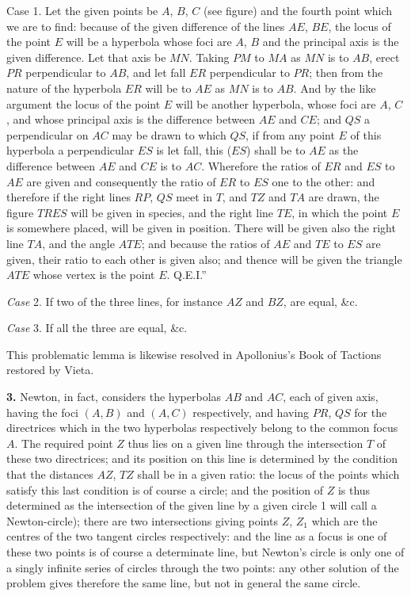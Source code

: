 \documentclass[11pt,a4paper]{book}
\begin{document}
Case 1. Let the given points be $A$, $B$, $C$ (see figure) and the fourth point which we are to find: because of the given difference of the lines $AE$, $BE$, the locus of the point $E$ will be a hyperbola whose foci are $A$, $B$ and the principal axis is the given difference. Let that axis be $MN$. Taking $PM$ to $MA$ as $MN$ is to $AB$, erect $PR$ perpendicular to $AB$, and let fall $ER$ perpendicular to $PR$; then from the nature of the hyperbola $ER$ will be to $AE$ as $MN$ is to $AB$. And by the like argument the locus of the point $E$ will be another hyperbola, whose foci are $A$, $C$, and whose principal axis is the difference between $AE$ and $CE$; and $QS$ a perpendicular on $AC$ may be drawn to which $QS$, if from any point $E$ of this hyperbola a perpendicular $ES$ is let fall, this ($ES$) shall be to $AE$ as the difference between $AE$ and $CE$ is to $AC$. Wherefore the ratios of $ER$ and $ES$ to $AE$ are given and consequently the ratio of $ER$ to $ES$ one to the other: and therefore if the right lines $RP$, $QS$ meet in $T$, and $TZ$ and $TA$ are drawn, the figure $TRES$ will be given in species, and the right line $TE$, in which the point $E$ is somewhere placed, will be given in position. There will be given also the right line $TA$, and the angle $ATE$; and because the ratios of $AE$ and $TE$ to $ES$ are given, their ratio to each other is given also; and thence will be given the triangle $ATE$ whose vertex is the point $E$. \hspace*{\fill} Q.E.I.''

\vspace{0.5em}
\textit{Case} 2. If two of the three lines, for instance $AZ$ and $BZ$, are equal, \&c.

\textit{Case} 3. If all the three are equal, \&c.

This problematic lemma is likewise resolved in Apollonius's Book of Tactions restored by Vieta.

\textbf{3.} Newton, in fact, considers the hyperbolas $AB$ and $AC$, each of given axis, having the foci $(A, B)$ and $(A, C)$ respectively, and having $PR$, $QS$ for the directrices which in the two hyperbolas respectively belong to the common focus $A$. The required point $Z$ thus lies on a given line through the intersection $T$ of these two directrices; and its position on this line is determined by the condition that the distances $AZ$, $TZ$ shall be in a given ratio: the locus of the points which satisfy this last condition is of course a circle; and the position of $Z$ is thus determined as the intersection of the given line by a given circle 1 will call a Newton-circle); there are two intersections giving points $Z$, $Z_1$ which are the centres of the two tangent circles respectively: and the line as a focus is one of these two points is of course a determinate line, but Newton's circle is only one of a singly infinite series of circles through the two points: any other solution of the problem gives therefore the same line, but not in general the same circle.
\end{document}
